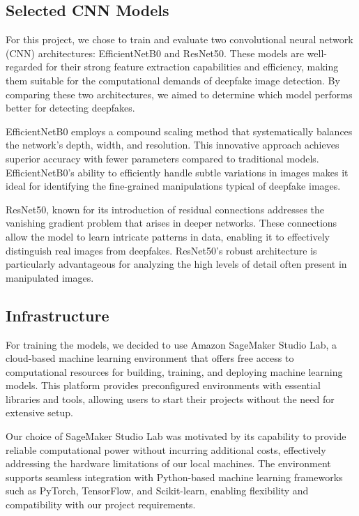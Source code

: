 \documentclass[conference]{IEEEtran}
\begin{document}
\subsection*{Selected CNN Models}
For this project, we chose to train and evaluate two convolutional neural network (CNN) architectures: EfficientNetB0 and ResNet50. These models are well-regarded for their strong feature extraction capabilities and efficiency, making them suitable for the computational demands of deepfake image detection. By comparing these two architectures, we aimed to determine which model performs better for detecting deepfakes.

EfficientNetB0 employs a compound scaling method that systematically balances the network's depth, width, and resolution. This innovative approach achieves superior accuracy with fewer parameters compared to traditional models. EfficientNetB0's ability to efficiently handle subtle variations in images makes it ideal for identifying the fine-grained manipulations typical of deepfake images.

ResNet50, known for its introduction of residual connections addresses the vanishing gradient problem that arises in deeper networks. These connections allow the model to learn intricate patterns in data, enabling it to effectively distinguish real images from deepfakes. ResNet50's robust architecture is particularly advantageous for analyzing the high levels of detail often present in manipulated images.

\subsection*{Infrastructure}
For training the models, we decided to use Amazon SageMaker Studio Lab, a cloud-based machine learning environment that offers free access to computational resources for building, training, and deploying machine learning models. This platform provides preconfigured environments with essential libraries and tools, allowing users to start their projects without the need for extensive setup.

Our choice of SageMaker Studio Lab was motivated by its capability to provide reliable computational power without incurring additional costs, effectively addressing the hardware limitations of our local machines. The environment supports seamless integration with Python-based machine learning frameworks such as PyTorch, TensorFlow, and Scikit-learn, enabling flexibility and compatibility with our project requirements.
\end{document}
